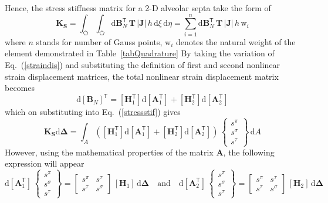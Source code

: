 Hence, the stress stiffness matrix for a 2-D alveolar septa take the form of
\begin{equation}
\mathbf{K}_\mathbf{S} = \int_{\pentagon} \int_{\pentagon}  \mathrm{d} \mathbf{B}_N^{\mathsf{T}} \, \mathbf{T} \, |\mathbf{J}|  \, h \,  \mathrm{d} \xi \,  \mathrm{d} \eta =  \sum_{i=1}^{n}   \mathrm{d} \mathbf{B}_N^{\mathsf{T}} \, \mathbf{T} \, |\mathbf{J}| \, h \, \mathrm{w}_i
\label{stressstif}
\end{equation}
where $n$ stands for number of Gauss points, $\mathrm{w}_i$ denotes the natural weight of the element demonstrated in Table~\ref{tabQuadrature}
By taking the variation of Eq.~(\ref{straindis}) and substituting the definition of first and second nonlinear strain displacement matrices, the total nonlinear strain displacement matrix becomes
\begin{equation}
\mathrm{d}[\mathbf{B}_N]^{\mathsf{T}} = [\mathbf{H}_1^{\mathsf{T}}] \mathrm{d} [\mathbf{A}_1^{\mathsf{T}}] + [\mathbf{H}_2^{\mathsf{T}}] \mathrm{d} [\mathbf{A}_2^{\mathsf{T}}] 
\end{equation}
which on substituting into Eq.~(\ref{stressstif}) gives 
\begin{equation}
\mathbf{K_\mathbf{S}} \mathrm{d} \boldsymbol{\Delta} = \int_A \left(
[\mathbf{H}_1^{\mathsf{T}}] \mathrm{d} [\mathbf{A}_1^{\mathsf{T}}] + [\mathbf{H}_2^{\mathsf{T}}] \mathrm{d} [\mathbf{A}_2^{\mathsf{T}}]\right) \, \begin{Bmatrix} s^{\pi} \\ s^{\sigma} \\  s^{\tau} \end{Bmatrix} \, \mathrm{d} A
\end{equation}
However, using the mathematical properties of the matrix $\mathbf{A}$, the following expression will appear
\begin{equation}
\mathrm{d} [\mathbf{A}_1^{\mathsf{T}}] \, \begin{Bmatrix} s^{\pi} \\ s^{\sigma} \\  s^{\tau} \end{Bmatrix} = \begin{bmatrix}s^{\pi} & s^{\tau} \\ 
s^{\tau} & s^{\sigma} \end{bmatrix} \, [\mathbf{H}_1] \, \mathrm{d} \boldsymbol{\Delta} \quad \text{and} \quad \mathrm{d} [\mathbf{A}_2^{\mathsf{T}}] \, \begin{Bmatrix} s^{\pi} \\ s^{\sigma} \\  s^{\tau} \end{Bmatrix} = \begin{bmatrix} s^{\pi} & s^{\tau} \\ 
s^{\tau} & s^{\sigma} \end{bmatrix} \, [\mathbf{H}_2] \, \mathrm{d} \boldsymbol{\Delta}
\end{equation}
